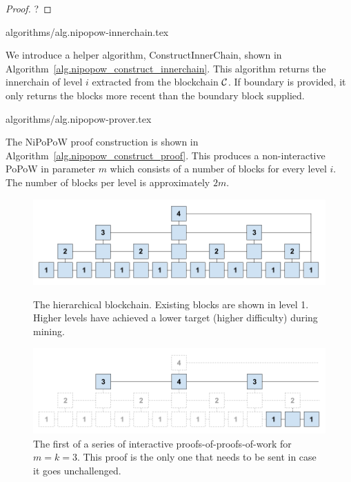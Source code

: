 \documentclass[11pt]{llncs}
\begin{document}
\begin{proof}
    ?
\end{proof}

{algorithms/alg.nipopow-innerchain.tex}

We introduce a helper algorithm, ConstructInnerChain, shown in
Algorithm~\ref{alg.nipopow_construct_innerchain}. This algorithm returns the innerchain
of level $i$ extracted from the blockchain $\mathcal{C}$. If boundary is provided,
it only returns the blocks more recent than the boundary block supplied.

{algorithms/alg.nipopow-prover.tex}

The NiPoPoW proof construction is shown in Algorithm~\ref{alg.nipopow_construct_proof}.
This produces a non-interactive PoPoW in parameter $m$ which consists of a
number of blocks for every level $i$. The number of blocks per level is
approximately $2m$.

\begin{figure}[h]
    \caption{The hierarchical blockchain. Existing blocks are shown in level 1.
    Higher levels have achieved a lower target (higher difficulty) during mining.}
    \centering
    \includegraphics[width=\textwidth,keepaspectratio]{figures/hierarchical-ledger.png}
    \label{fig:hierarchy}
\end{figure}

\begin{figure}[h]
    \caption{The first of a series of interactive proofs-of-proofs-of-work for
    $m = k = 3$. This proof is the only one that needs to be sent in case it
    goes unchallenged.}
    \centering
    \includegraphics[width=\textwidth,keepaspectratio]{figures/interactive-popow.png}
\end{figure}
\end{document}
